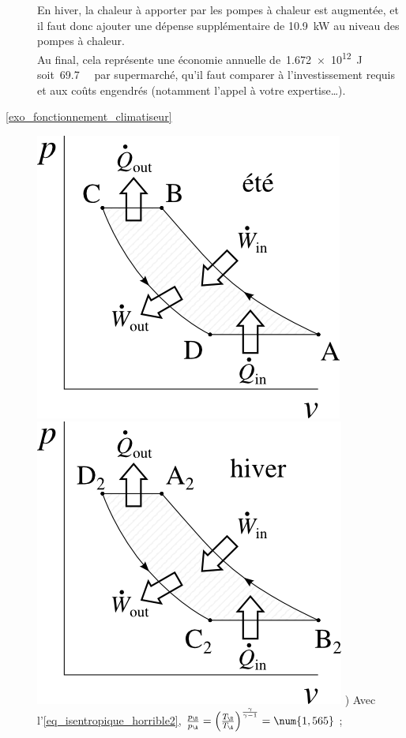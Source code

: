 \begin{description}
			En hiver, la chaleur à apporter par les pompes à chaleur est augmentée, et il faut donc ajouter une dépense supplémentaire de \SI{10,9}{\kilo\watt} au niveau des pompes à chaleur.\\
			Au final, cela représente une économie annuelle de~\SI{1,672e12}{\joule} soit~\SI{69,7}{\kilo\euroo} par supermarché, qu’il faut comparer à l’investissement requis et aux coûts engendrés (notamment l’appel à votre expertise…).
	\item [\ref{exo_fonctionnement_climatiseur}]
				\includegraphics[height=\solutiondiagramwidth]{images/exo_sol_pv_climatiseur.png}
				\includegraphics[height=\solutiondiagramwidth]{images/exo_sol_pv_thermopompe.png}
				) Avec l’\cref{eq_isentropique_horrible2}, $\frac{p_\B }{p_\A} = \left(\frac{T_\B}{T_\A}\right)^{\frac{\gamma}{\gamma - 1}} = \num{1,565}$ ;

\end{description}
